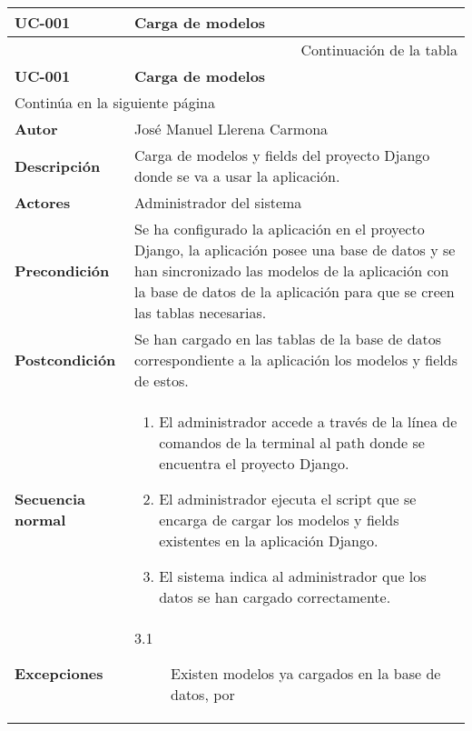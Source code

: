 \begin{center}
\begin{longtable}{||p{3.4cm}|p{12cm}||}
 \hline \hline \bf UC-001 &  \bf Carga de modelos \\
\hline
\endfirsthead
\hline \multicolumn{2}{|r|}{{Continuación de la tabla}} \\ \hline
 \hline \bf UC-001 &  \bf Carga de modelos \\
\hline
\endhead
\hline \multicolumn{2}{|l|}{{Continúa en la siguiente página}} \\ \hline
\endfoot
\endlastfoot
 \hline \bf Autor & José Manuel Llerena Carmona \\
 \hline \bf Descripción & Carga de modelos y fields del proyecto Django
             donde se va a usar la aplicación.\\
 \hline \bf Actores & Administrador del sistema\\
 \hline \bf Precondición & Se ha configurado la aplicación en el proyecto
             Django, la aplicación posee una base de datos y se han sincronizado
             las modelos de la aplicación con la base de datos de la aplicación
             para que se creen las tablas necesarias.\\
 \hline \bf Postcondición & Se han cargado en las tablas de la base de datos
             correspondiente a la aplicación los modelos y fields de estos.\\
 \hline \bf Secuencia normal & 
             \begin{enumerate}
                \item El administrador accede a través de la línea de comandos
                       de la terminal al path donde se encuentra el proyecto Django.
                \item El administrador ejecuta el script que se encarga de
                       cargar los modelos y fields existentes en la aplicación
                       Django.
                \item El sistema indica al administrador que los datos se han
                       cargado correctamente.
             \end{enumerate}\\
 \hline \bf Excepciones &
             \begin{description}
                \item[3.1] Existen modelos ya cargados en la base de datos, por

\end{description}
\end{longtable}
\end{center}
